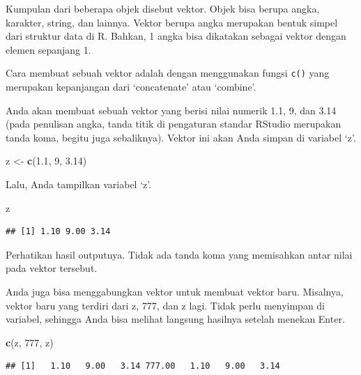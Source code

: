 \documentclass[openany]{book}
\newenvironment{Shaded}{\begin{snugshade}}{\end{snugshade}}
\newcommand{\KeywordTok}[1]{\textcolor[rgb]{0.13,0.29,0.53}{\textbf{#1}}}
\newcommand{\DecValTok}[1]{\textcolor[rgb]{0.00,0.00,0.81}{#1}}
\newcommand{\FloatTok}[1]{\textcolor[rgb]{0.00,0.00,0.81}{#1}}
\newcommand{\StringTok}[1]{\textcolor[rgb]{0.31,0.60,0.02}{#1}}
\newcommand{\NormalTok}[1]{#1}
\begin{document}
Kumpulan dari beberapa objek disebut vektor. Objek bisa berupa angka,
karakter, string, dan lainnya. Vektor berupa angka merupakan bentuk
simpel dari struktur data di R. Bahkan, 1 angka bisa dikatakan sebagai
vektor dengan elemen sepanjang 1.

Cara membuat sebuah vektor adalah dengan menggunakan fungsi \texttt{c()}
yang merupakan kepanjangan dari `concatenate' atau `combine'.

Anda akan membuat sebuah vektor yang berisi nilai numerik 1.1, 9, dan
3.14 (pada penulisan angka, tanda titik di pengaturan standar RStudio
merupakan tanda koma, begitu juga sebaliknya). Vektor ini akan Anda
simpan di variabel `z'.

\begin{Shaded}
\begin{Highlighting}[]
\NormalTok{z <-}\StringTok{ }\KeywordTok{c}\NormalTok{(}\FloatTok{1.1}\NormalTok{, }\DecValTok{9}\NormalTok{, }\FloatTok{3.14}\NormalTok{)}
\end{Highlighting}
\end{Shaded}

Lalu, Anda tampilkan variabel `z'.

\begin{Shaded}
\begin{Highlighting}[]
\NormalTok{z}
\end{Highlighting}
\end{Shaded}

\begin{verbatim}
## [1] 1.10 9.00 3.14
\end{verbatim}

Perhatikan hasil outputnya. Tidak ada tanda koma yang memisahkan antar
nilai pada vektor tersebut.

Anda juga bisa menggabungkan vektor untuk membuat vektor baru. Misalnya,
vektor baru yang terdiri dari z, 777, dan z lagi. Tidak perlu menyimpan
di variabel, sehingga Anda bisa melihat langsung hasilnya setelah
menekan Enter.

\begin{Shaded}
\begin{Highlighting}[]
\KeywordTok{c}\NormalTok{(z, }\DecValTok{777}\NormalTok{, z)}
\end{Highlighting}
\end{Shaded}

\begin{verbatim}
## [1]   1.10   9.00   3.14 777.00   1.10   9.00   3.14
\end{verbatim}
\end{document}
